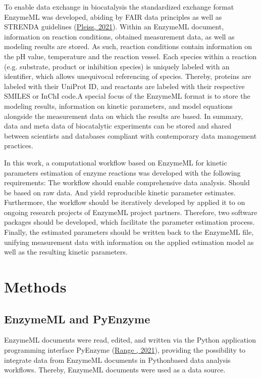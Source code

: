 \documentclass[letterpaper,12pt,english]{jupyterBook}
\begin{document}
\sphinxAtStartPar
To enable data exchange in biocatalysis the standardized exchange format EnzymeML was developed, abiding by FAIR data principles as well as STRENDA guidelines (\hyperlink{cite.references:id4}{Pleiss, 2021}). Within an EnzymeML document, information on reaction conditions, obtained measurement data, as well as modeling results are stored. As such, reaction conditions contain information on the pH value, temperature and the reaction vessel. Each species within a reaction (e.g. substrate, product or inhibition species) is uniquely labeled with an identifier, which allows unequivocal referencing of species. Thereby, proteins are labeled with their UniProt ID, and reactants are labeled with their respective SMILES or InChI code.A special focus of the EnzymeML format is to store the modeling results, information on kinetic parameters, and model equations alongside the measurement data on which the results are based. In summary, data and meta data of biocatalytic experiments can be stored and shared between scientists and databases compliant with contemporary data management practices.

\sphinxAtStartPar
In this work, a computational workflow based on EnzymeML for kinetic parameters estimation of enzyme reactions was developed with the following requirements: The workflow should enable comprehensive data analysis. Should be based on raw data. And yield reproducible kinetic parameter estimates. Furthermore, the workflow should be iteratively developed by applied it to on ongoing research projects of EnzymeML project partners. Therefore, two software packages should be developed, which facilitate the parameter estimation process. Finally, the estimated parameters should be written back to the EnzymeML file, unifying measurement data with information on the applied estimation model as well as the resulting kinetic parameters.

\sphinxstepscope


\chapter{Methods}
\label{\detokenize{methods:methods}}\label{\detokenize{methods::doc}}

\section{EnzymeML and PyEnzyme}
\label{\detokenize{methods:enzymeml-and-pyenzyme}}
\sphinxAtStartPar
EnzymeML documents were read, edited, and written via the Python application programming interface PyEnzyme (\hyperlink{cite.references:id12}{Range , 2021}), providing the possibility to integrate data from EnzymeML documents in Python\sphinxhyphen{}based data analysis workflows. Thereby, EnzymeML documents were used as a data source.
\end{document}

